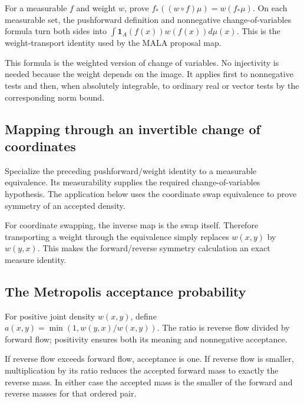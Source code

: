 \documentclass[11pt,a4paper]{report}
\begin{document}
For a measurable \(f\) and weight \(w\), prove \(f_*((w\circ f)\mu)=w(f_*\mu)\). On each measurable set, the pushforward definition and nonnegative change-of-variables formula turn both sides into \(\int\mathbf1_A(f(x))w(f(x))d\mu(x)\). This is the weight-transport identity used by the MALA proposal map.



This formula is the weighted version of change of variables. No injectivity is needed because the weight depends on the image. It applies first to nonnegative tests and then, when absolutely integrable, to ordinary real or vector tests by the corresponding norm bound.

\subsection{\texorpdfstring{Mapping through an invertible change of coordinates}{Mapping through an invertible change of coordinates}}
\label{report-step-UnadjustedLangevin-Metropolis-lean-8}


Specialize the preceding pushforward/\allowbreak{}weight identity to a measurable equivalence. Its measurability supplies the required change-of-variables hypothesis. The application below uses the coordinate swap equivalence to prove symmetry of an accepted density.



For coordinate swapping, the inverse map is the swap itself. Therefore transporting a weight through the equivalence simply replaces \(w(x,y)\) by \(w(y,x)\). This makes the forward/\allowbreak{}reverse symmetry calculation an exact measure identity.

\subsection{\texorpdfstring{The Metropolis acceptance probability}{The Metropolis acceptance probability}}
\label{report-step-UnadjustedLangevin-Metropolis-lean-9}


For positive joint density \(w(x,y)\), define \(a(x,y)=\min(1,w(y,x)/w(x,y))\). The ratio is reverse flow divided by forward flow; positivity ensures both its meaning and nonnegative acceptance.



If reverse flow exceeds forward flow, acceptance is one. If reverse flow is smaller, multiplication by its ratio reduces the accepted forward mass to exactly the reverse mass. In either case the accepted mass is the smaller of the forward and reverse masses for that ordered pair.
\end{document}
